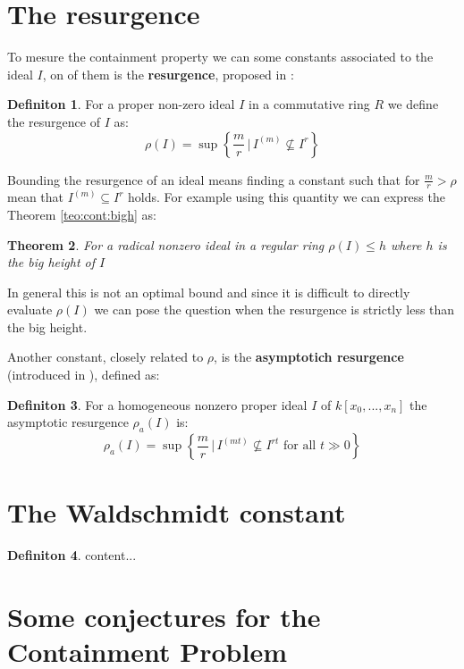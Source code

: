 \documentclass[]{book}
\theoremstyle{plain}
\newtheorem{teo}{Theorem}[section]
\theoremstyle{remark}
\theoremstyle{definition}
\newtheorem{deff}[teo]{Definiton}
\newcommand{\cont}[2]{ I^{(#1)} \subseteq I^{#2}}
\begin{document}
\section{The resurgence}
To mesure the containment property we can some constants associated to the ideal $ I $, on of them is the \textbf{resurgence}, proposed in \cite{Boc09resurgence}:
\begin{deff}
	For a proper non-zero ideal $ I $ in a commutative ring $ R $ we define the resurgence of $ I $ as:
	\begin{equation*}
		\rho(I)= \sup \left\lbrace \frac{m}{r} \, | \, I^{(m)} \not \subseteq I^r \right\rbrace 
	\end{equation*}
\end{deff}
Bounding the resurgence of an ideal means finding a constant such that for $ \frac{m}{r} > \rho $ mean that $ \cont{m}{r} $ holds.
For example using this quantity we can express the Theorem \ref{teo:cont:bigh} as:
\begin{teo}
	For a radical nonzero ideal in a regular ring $ \rho(I) \leq h $ where $ h $ is the big height of $ I $
\end{teo}
In general this is not an optimal bound and since it is difficult to directly evaluate $ \rho(I) $ we can pose the question when the resurgence is strictly less than the big height. 

Another constant, closely related to $ \rho $, is the \textbf{asymptotich resurgence} (introduced in \cite{Guardo2012}), defined as:
\begin{deff}
	For a homogeneous nonzero proper ideal $ I $ of $ k[x_0 , ... , x_n] $ the asymptotic resurgence $ \rho_a(I) $ is:
	\[ \rho_a(I) = \sup \left\lbrace \frac{m}{r} \, | \, I^{(mt)} \not \subseteq I^{rt} \text{ for all } t \gg 0 \right\rbrace \]
\end{deff}


	
\section{The Waldschmidt constant}

\begin{deff}
content...
\end{deff}

\section{Some conjectures for the Containment Problem}
\end{document}
